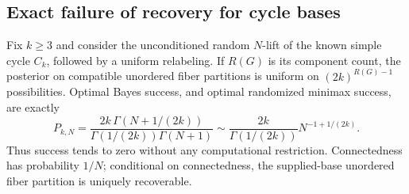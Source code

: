 \subsection{Exact failure of recovery for cycle bases}
\begin{theorem}\label{thm:cycle-boundary}
Fix $k\ge3$ and consider the unconditioned random $N$-lift of the
known simple cycle $C_k$, followed by a uniform relabeling. If $R(G)$
is its component count, the posterior on compatible unordered fiber
partitions is uniform on $(2k)^{R(G)-1}$ possibilities. Optimal Bayes
success, and optimal randomized minimax success, are exactly
\begin{equation}\label{eq:cycle-success}
 P_{k,N}=\frac{2k\,\Gamma(N+1/(2k))}
 {\Gamma(1/(2k))\Gamma(N+1)}
 \sim\frac{2k}{\Gamma(1/(2k))}N^{-1+1/(2k)}.
\end{equation}
Thus success tends to zero without any computational restriction.
Connectedness has probability $1/N$; conditional on connectedness,
the supplied-base unordered fiber partition is uniquely recoverable.
\end{theorem}
